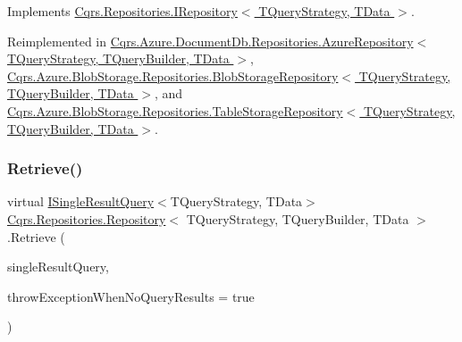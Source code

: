 Implements \hyperlink{interfaceCqrs_1_1Repositories_1_1IRepository_ae545451c48d1e2b5693db73e169e100d}{Cqrs.\+Repositories.\+I\+Repository$<$ T\+Query\+Strategy, T\+Data $>$}.



Reimplemented in \hyperlink{classCqrs_1_1Azure_1_1DocumentDb_1_1Repositories_1_1AzureRepository_a22c58163e101a6cb80f891bed6114380}{Cqrs.\+Azure.\+Document\+Db.\+Repositories.\+Azure\+Repository$<$ T\+Query\+Strategy, T\+Query\+Builder, T\+Data $>$}, \hyperlink{classCqrs_1_1Azure_1_1BlobStorage_1_1Repositories_1_1BlobStorageRepository_a7c5a3ca4d92cf4954508fb3e583eb49e}{Cqrs.\+Azure.\+Blob\+Storage.\+Repositories.\+Blob\+Storage\+Repository$<$ T\+Query\+Strategy, T\+Query\+Builder, T\+Data $>$}, and \hyperlink{classCqrs_1_1Azure_1_1BlobStorage_1_1Repositories_1_1TableStorageRepository_a7238452f19c9d51b5733df7701920605}{Cqrs.\+Azure.\+Blob\+Storage.\+Repositories.\+Table\+Storage\+Repository$<$ T\+Query\+Strategy, T\+Query\+Builder, T\+Data $>$}.

\mbox{\label{classCqrs_1_1Repositories_1_1Repository_a4f83093a92d8141cdc2b908bbbd97f32}} 
\subsubsection{\texorpdfstring{Retrieve()}{Retrieve()}\hspace{0.1cm}{\footnotesize\ttfamily [1/2]}}
{\footnotesize\ttfamily virtual \hyperlink{interfaceCqrs_1_1Repositories_1_1Queries_1_1ISingleResultQuery}{I\+Single\+Result\+Query}$<$T\+Query\+Strategy, T\+Data$>$ \hyperlink{classCqrs_1_1Repositories_1_1Repository}{Cqrs.\+Repositories.\+Repository}$<$ T\+Query\+Strategy, T\+Query\+Builder, T\+Data $>$.Retrieve (\begin{DoxyParamCaption}\item[{\hyperlink{interfaceCqrs_1_1Repositories_1_1Queries_1_1ISingleResultQuery}{I\+Single\+Result\+Query}$<$ T\+Query\+Strategy, T\+Data $>$}]{single\+Result\+Query,  }\item[{bool}]{throw\+Exception\+When\+No\+Query\+Results = {\ttfamily true} }\end{DoxyParamCaption})\hspace{0.3cm}{\ttfamily [virtual]}}



